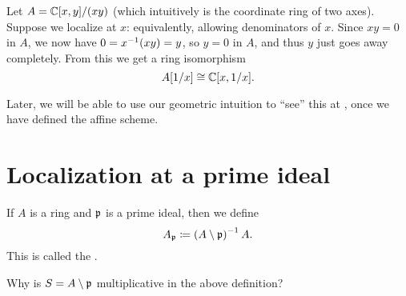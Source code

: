 
\begin{example}
	Let $A = \mathbb C[x,y] / (xy)$
	(which intuitively is the coordinate ring of two axes).
	Suppose we localize at $x$:
	equivalently, allowing denominators of $x$.
	Since $xy = 0$ in $A$, we now have $0 = x^{-1} (xy) = y$,
	so $y = 0$ in $A$, and thus $y$ just goes away completely.
	From this we get a ring isomorphism
	\[ A[1/x] \cong \mathbb C[x,1/x].\]

	Later, we will be able to use our geometric intuition to ``see'' this
	at , once
	we have defined the affine scheme.
\end{example}

\section{Localization at a prime ideal}
\label{sec:localize_prime_ideal}

\begin{definition}
	If $A$ is a ring and $\mathfrak p$ is a prime ideal, then we define
	\[ A_\mathfrak p \coloneqq \left( A \setminus \mathfrak p \right)^{-1} A. \]
	This is called the .
\end{definition}
\begin{ques}
	Why is $S = A \setminus \mathfrak p$ multiplicative
	in the above definition?
\end{ques}


